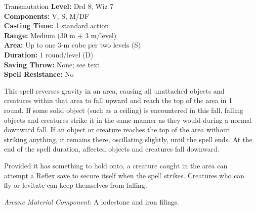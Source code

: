 {Transmutation}
{
	\textbf{Level:}
	Drd 8, Wiz 7\\
	\textbf{Components:}
	V, S, M/DF\\
	\textbf{Casting Time:}
	1 standard action\\
	\textbf{Range:}
	Medium (30 m + 3 m/level)\\
	\textbf{Area:}
	Up to one 3-m cube per two levels (S)\\
	\textbf{Duration:}
	1 round/level (D)\\
	\textbf{Saving Throw:}
	None; see text\\
	\textbf{Spell Resistance:}
	No\\
}
{
	This spell reverses gravity in an area, causing all unattached objects and creatures within that area to fall upward and reach the top of the area in 1 round. If some solid object (such as a ceiling) is encountered in this fall, falling objects and creatures strike it in the same manner as they would during a normal downward fall. If an object or creature reaches the top of the area without striking anything, it remains there, oscillating slightly, until the spell ends. At the end of the spell duration, affected objects and creatures fall downward.

	Provided it has something to hold onto, a creature caught in the area can attempt a Reflex save to secure itself when the spell strikes. Creatures who can fly or levitate can keep themselves from falling.

	\textit{Arcane Material Component}:
	A lodestone and iron filings.

}
